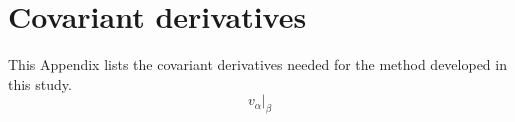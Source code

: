 \section{Covariant derivatives}\label{appderivative}
This Appendix lists the covariant derivatives needed for the method developed in this study.
\begin{equation}
v_{\alpha}\vert_\beta
\end{equation}

